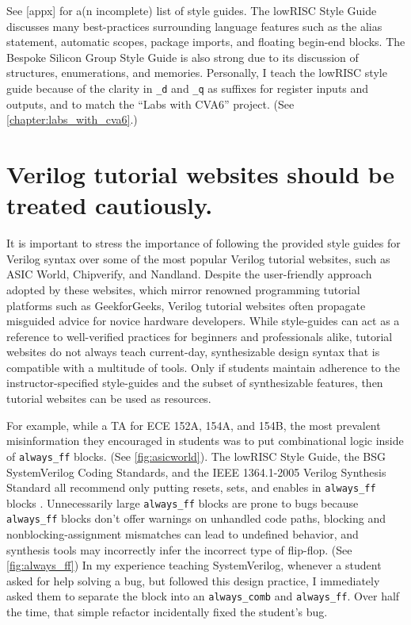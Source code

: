See [appx] for a(n incomplete) list of style guides. The lowRISC Style Guide discusses many best-practices surrounding language features such as the alias statement, automatic scopes, package imports, and floating begin-end blocks. The Bespoke Silicon Group Style Guide is also strong due to its discussion of structures, enumerations, and memories. Personally, I teach the lowRISC style guide because of the clarity in \texttt{_d} and \texttt{_q} as suffixes for register inputs and outputs, and to match the ``Labs with CVA6'' project. (See \autoref{chapter:labs_with_cva6}.)

\section{Verilog tutorial websites should be treated cautiously.}

It is important to stress the importance of following the provided style guides for Verilog syntax over some of the most popular Verilog tutorial websites, such as ASIC World, Chipverify, and Nandland. Despite the user-friendly approach adopted by these websites, which mirror renowned programming tutorial platforms such as GeekforGeeks, Verilog tutorial websites often propagate misguided advice for novice hardware developers. While style-guides can act as a reference to well-verified practices for beginners and professionals alike, tutorial websites do not always teach current-day, synthesizable design syntax that is compatible with a multitude of tools. Only if students maintain adherence to the instructor-specified style-guides and the subset of synthesizable features, then tutorial websites can be used as resources.




For example, while a TA for ECE 152A, 154A, and 154B, the most prevalent misinformation they encouraged in students was to put combinational logic inside of \texttt{always_ff} blocks. (See \autoref{fig:asicworld}). The lowRISC Style Guide, the BSG SystemVerilog Coding Standards, and the IEEE 1364.1-2005 Verilog Synthesis Standard all recommend only putting resets, sets, and enables in \texttt{always_ff} blocks \cite{lowRISCstyleguides, BSGstyleguide, 1364.1-2005}. Unnecessarily large \texttt{always_ff} blocks are prone to bugs because \texttt{always_ff} blocks don't offer warnings on unhandled code paths, blocking and nonblocking-assignment mismatches can lead to undefined behavior, and synthesis tools may incorrectly infer the incorrect type of flip-flop. (See \autoref{fig:always_ff}) In my experience teaching SystemVerilog, whenever a student asked for help solving a bug, but followed this design practice, I immediately asked them to separate the block into an \texttt{always_comb} and \texttt{always_ff}. Over half the time, that simple refactor incidentally fixed the student's bug.

